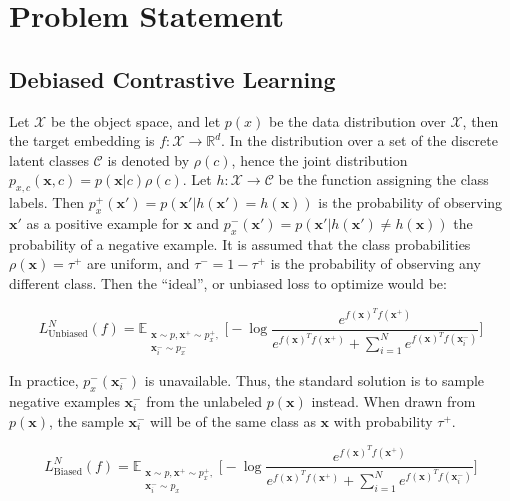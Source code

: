 \documentclass{article}
\begin{document}
\section{Problem Statement}
\label{sec:headings}

\subsection{Debiased Contrastive Learning}

Let $\mathcal{X}$ be the object space, and let $p(x)$ be the data distribution over $\mathcal{X}$, then the target embedding is $f: \mathcal{X} \rightarrow \mathbb{R}^d$. In \citep{chuang2020debiased} the distribution over a set of the discrete latent classes $\mathcal{C}$ is denoted by $\rho(c)$, hence the joint distribution $p_{x,c}(\textbf{x}, c) = p(\textbf{x}|c)\rho(c)$. Let $h : \mathcal{X} \rightarrow \mathcal{C}$ be the function assigning the class labels. Then $p^+_x(\textbf{x}') = p(\textbf{x}'|h(\textbf{x}') = h(\textbf{x}))$ is the probability of observing $\textbf{x}'$ as a positive example for $\textbf{x}$ and $p^-_x(\textbf{x}') = p(\textbf{x}'|h(\textbf{x}') \neq h(\textbf{x}))$ the probability of a negative example. It is assumed that the class probabilities $\rho(\textbf{x}) = \tau^+$ are uniform, and $\tau^- = 1 - \tau^+$ is the probability of observing any different class. Then the  ``ideal'', or unbiased loss to optimize would be:

\begin{equation}  \label{eq:2}
L_{\text{Unbiased}}^N(f) = \mathbb{E}_{\substack{\textbf{x} \sim p, \textbf{x}^+ \sim p^+_x,\\ \textbf{x}_i^- \sim p_x^-}} \bigg[-\log \frac{e^{f(\textbf{x})^T f(\textbf{x}^+)}}{e^{f(\textbf{x})^T f(\textbf{x}^+)} + \sum _{i=1}^N e^{f(\textbf{x})^T f(\textbf{x}_i^-)}}\bigg]
\end{equation}

In practice, $p_x^-(\textbf{x}_i^-)$ is unavailable. Thus, the standard solution is to sample negative examples $\textbf{x}_i^-$ from the unlabeled $p(\textbf{x})$ instead. When drawn from $p(\textbf{x})$, the sample $\textbf{x}_i^-$ will be of the same class as $\textbf{x}$ with probability $\tau^+$.

\begin{equation} \label{eq:3}
L_{\text{Biased}}^N(f) = \mathbb{E}_{\substack{\textbf{x} \sim p, \textbf{x}^+ \sim p^+_x,\\ \textbf{x}_i^- \sim p_x}} \bigg[-\log \frac{e^{f(\textbf{x})^T f(\textbf{x}^+)}}{e^{f(\textbf{x})^T f(\textbf{x}^+)} + \sum _{i=1}^N e^{f(\textbf{x})^T f(\textbf{x}_i^-)}}\bigg]
\end{equation}
\end{document}

